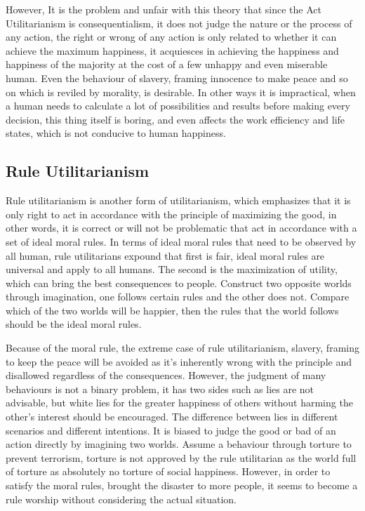 \documentclass[9pt,twocolumn,twoside,lineno]{gsajnl}
\begin{document}
However, It is the problem and unfair with this theory that since the Act Utilitarianism is consequentialism, it does not judge the nature or the process of any action, the right or wrong of any action is only related to whether it can achieve the maximum happiness,  it acquiesces in achieving the happiness and happiness of the majority at the cost of a few unhappy and even miserable human.  Even the behaviour of slavery, framing innocence to make peace and so on which is reviled by morality, is desirable.  In other ways it is impractical, when a human needs to calculate a lot of possibilities and results before making every decision, this thing itself is boring, and even affects the work efficiency and life states, which is not conducive to human happiness.
\subsection{Rule Utilitarianism}
Rule utilitarianism is another form of utilitarianism, which emphasizes that it is only right to act in accordance with the principle of maximizing the good, in other words, it is correct or will not be problematic that act in accordance with a set of ideal moral rules. In terms of ideal moral rules that need to be observed by all human, rule utilitarians expound that first is fair, ideal moral rules are universal and apply to all humans. The second is the maximization of utility, which can bring the best consequences to people. Construct two opposite worlds through imagination, one follows certain rules and the other does not. Compare which of the two worlds will be happier, then the rules that the world follows should be the ideal moral rules.

Because of the moral rule, the extreme case of rule utilitarianism, slavery, framing to keep the peace will be avoided as it's inherently wrong with the principle and disallowed regardless of the consequences. However, the judgment of many behaviours is not a binary problem, it has two sides such as lies are not advisable, but white lies for the greater happiness of others without harming the other's interest should be encouraged. The difference between lies in different scenarios and different intentions. It is biased to judge the good or bad of an action directly by imagining two worlds. Assume a behaviour through torture to prevent terrorism, torture is not approved by the rule utilitarian as the world full of torture as absolutely no torture of social happiness. However, in order to satisfy the moral rules, brought the disaster to more people, it seems to become a rule worship without considering the actual situation.
\end{document}
